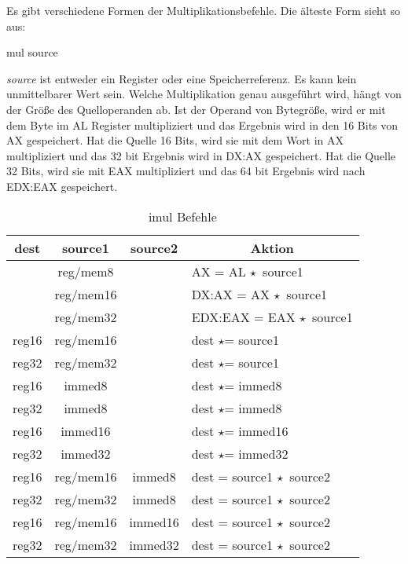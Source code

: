 Es gibt verschiedene Formen der Multiplikationsbefehle. Die \"{a}lteste
Form sieht so aus:
\begin{AsmCodeListing}[numbers=none, frame=none]
      mul   source
\end{AsmCodeListing}
\emph{source} ist entweder ein Register oder eine Speicherreferenz.
Es kann kein unmittelbarer Wert sein. Welche Multiplikation genau
ausgef\"{u}hrt wird, h\"{a}ngt von der Gr\"{o}{\ss}e des Quelloperanden ab. Ist der
Operand von Bytegr\"{o}{\ss}e, wird er mit dem Byte im AL Register
multipliziert und das Ergebnis wird in den 16 Bits von AX
gespeichert. Hat die Quelle 16 Bits, wird sie mit dem Wort in AX
multipliziert und das 32 bit Ergebnis wird in DX:AX gespeichert. Hat
die Quelle 32 Bits, wird sie mit EAX multipliziert und das 64 bit
Ergebnis wird nach EDX:EAX gespeichert.

\begin{table}[ht]
\centering
\begin{tabular}{|c|c|c|l|}
\hline
 { \bf dest} & { \bf source1 } & {\bf source2} & \multicolumn{1}{c|}{\bf Aktion} \\
\hline
             & reg/mem8        &               & AX = AL $\star\,$ source1 \\
             & reg/mem16       &               & DX:AX = AX $\star\,$ source1 \\
             & reg/mem32       &               & EDX:EAX = EAX $\star\,$ source1 \\
 reg16       & reg/mem16       &               & dest $\star$= source1 \\
 reg32       & reg/mem32       &               & dest $\star$= source1 \\
 reg16       & immed8          &               & dest $\star$= immed8 \\
 reg32       & immed8          &               & dest $\star$= immed8 \\
 reg16       & immed16         &               & dest $\star$= immed16 \\
 reg32       & immed32         &               & dest $\star$= immed32 \\
 reg16       & reg/mem16       & immed8        & dest = source1 $\star\,$ source2 \\
 reg32       & reg/mem32       & immed8        & dest = source1 $\star\,$ source2 \\
 reg16       & reg/mem16       & immed16       & dest = source1 $\star\,$ source2 \\
 reg32       & reg/mem32       & immed32       & dest = source1 $\star\,$ source2 \\
\hline
\end{tabular}
\caption{{\code imul} Befehle \label{tab:imul}}
\end{table}

